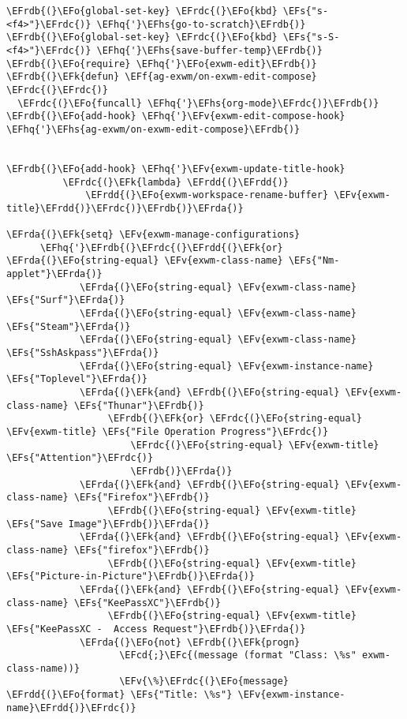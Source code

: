 \documentclass[a4wide,10pt]{article}
\newcommand{\EFc}[1]{\textcolor{EFc}{#1}} %
\newcommand{\EFcd}[1]{\textcolor{EFcd}{#1}} %
\newcommand{\EFs}[1]{\textcolor{EFs}{#1}} %
\newcommand{\EFk}[1]{\textcolor{EFk}{#1}} %
\newcommand{\EFf}[1]{\textcolor{EFf}{#1}} %
\newcommand{\EFv}[1]{\textcolor{EFv}{#1}} %
\newcommand{\EFo}[1]{\textcolor{EFo}{#1}} %
\newcommand{\EFhq}[1]{\textcolor{EFhq}{#1}} %
\newcommand{\EFhs}[1]{\textcolor{EFhs}{#1}} %
\newcommand{\EFrda}[1]{\textcolor{EFrda}{#1}} %
\newcommand{\EFrdb}[1]{\textcolor{EFrdb}{#1}} %
\newcommand{\EFrdc}[1]{\textcolor{EFrdc}{#1}} %
\newcommand{\EFrdd}[1]{\textcolor{EFrdd}{#1}} %
\begin{document}
\begin{Code}
\begin{Verbatim}
\EFrdb{(}\EFo{global-set-key} \EFrdc{(}\EFo{kbd} \EFs{"s-<f4>"}\EFrdc{)} \EFhq{'}\EFhs{go-to-scratch}\EFrdb{)}
\EFrdb{(}\EFo{global-set-key} \EFrdc{(}\EFo{kbd} \EFs{"s-S-<f4>"}\EFrdc{)} \EFhq{'}\EFhs{save-buffer-temp}\EFrdb{)}
\EFrdb{(}\EFo{require} \EFhq{'}\EFo{exwm-edit}\EFrdb{)}
\EFrdb{(}\EFk{defun} \EFf{ag-exwm/on-exwm-edit-compose} \EFrdc{(}\EFrdc{)}
  \EFrdc{(}\EFo{funcall} \EFhq{'}\EFhs{org-mode}\EFrdc{)}\EFrdb{)}
\EFrdb{(}\EFo{add-hook} \EFhq{'}\EFv{exwm-edit-compose-hook} \EFhq{'}\EFhs{ag-exwm/on-exwm-edit-compose}\EFrdb{)}


\EFrdb{(}\EFo{add-hook} \EFhq{'}\EFv{exwm-update-title-hook}
          \EFrdc{(}\EFk{lambda} \EFrdd{(}\EFrdd{)}
              \EFrdd{(}\EFo{exwm-workspace-rename-buffer} \EFv{exwm-title}\EFrdd{)}\EFrdc{)}\EFrdb{)}\EFrda{)}

\EFrda{(}\EFk{setq} \EFv{exwm-manage-configurations}
      \EFhq{'}\EFrdb{(}\EFrdc{(}\EFrdd{(}\EFk{or} \EFrda{(}\EFo{string-equal} \EFv{exwm-class-name} \EFs{"Nm-applet"}\EFrda{)}
             \EFrda{(}\EFo{string-equal} \EFv{exwm-class-name} \EFs{"Surf"}\EFrda{)}
             \EFrda{(}\EFo{string-equal} \EFv{exwm-class-name} \EFs{"Steam"}\EFrda{)}
             \EFrda{(}\EFo{string-equal} \EFv{exwm-class-name} \EFs{"SshAskpass"}\EFrda{)}
             \EFrda{(}\EFo{string-equal} \EFv{exwm-instance-name} \EFs{"Toplevel"}\EFrda{)}
             \EFrda{(}\EFk{and} \EFrdb{(}\EFo{string-equal} \EFv{exwm-class-name} \EFs{"Thunar"}\EFrdb{)}
                  \EFrdb{(}\EFk{or} \EFrdc{(}\EFo{string-equal} \EFv{exwm-title} \EFs{"File Operation Progress"}\EFrdc{)}
                      \EFrdc{(}\EFo{string-equal} \EFv{exwm-title} \EFs{"Attention"}\EFrdc{)}
                      \EFrdb{)}\EFrda{)}
             \EFrda{(}\EFk{and} \EFrdb{(}\EFo{string-equal} \EFv{exwm-class-name} \EFs{"Firefox"}\EFrdb{)}
                  \EFrdb{(}\EFo{string-equal} \EFv{exwm-title} \EFs{"Save Image"}\EFrdb{)}\EFrda{)}
             \EFrda{(}\EFk{and} \EFrdb{(}\EFo{string-equal} \EFv{exwm-class-name} \EFs{"firefox"}\EFrdb{)}
                  \EFrdb{(}\EFo{string-equal} \EFv{exwm-title} \EFs{"Picture-in-Picture"}\EFrdb{)}\EFrda{)}
             \EFrda{(}\EFk{and} \EFrdb{(}\EFo{string-equal} \EFv{exwm-class-name} \EFs{"KeePassXC"}\EFrdb{)}
                  \EFrdb{(}\EFo{string-equal} \EFv{exwm-title} \EFs{"KeePassXC -  Access Request"}\EFrdb{)}\EFrda{)}
             \EFrda{(}\EFo{not} \EFrdb{(}\EFk{progn}
                    \EFcd{;}\EFc{(message (format "Class: \%s" exwm-class-name))}
                    \EFv{\%}\EFrdc{(}\EFo{message} \EFrdd{(}\EFo{format} \EFs{"Title: \%s"} \EFv{exwm-instance-name}\EFrdd{)}\EFrdc{)}

\end{Verbatim}
\end{Code}
\end{document}
